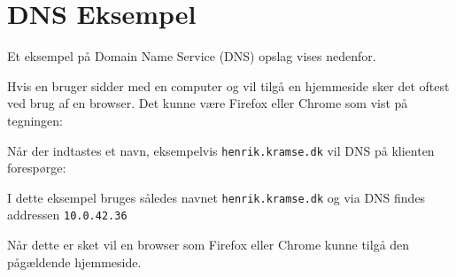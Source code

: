 \documentclass[a4paper,11pt,notitlepage]{report}
\begin{document}
\chapter{DNS Eksempel}

Et eksempel på Domain Name Service (DNS) opslag vises nedenfor.

Hvis en bruger sidder med en computer og vil tilgå en hjemmeside sker det oftest ved brug af en browser. Det kunne være Firefox eller Chrome som vist på tegningen:


Når der indtastes et navn, eksempelvis \verb+henrik.kramse.dk+ vil DNS på klienten forespørge:


I dette eksempel bruges således navnet \verb+henrik.kramse.dk+ og via DNS findes addressen \verb+10.0.42.36+

Når dette er sket vil en browser som Firefox eller Chrome kunne tilgå den pågældende hjemmeside.


\label{LastPage}
\end{document}
